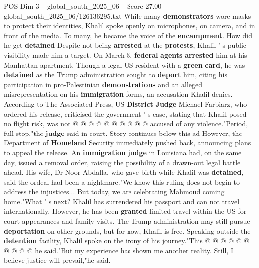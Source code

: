 \begin{textsample}{POS Dim 3 – global\_south\_2025\_06 – Score 27.00 – global\_south\_2025\_06/126136295.txt}
While many \textbf{demonstrators} wore masks to protect their identities, Khalil spoke openly on microphones, on camera, and in front of the media.
To many, he became the voice of the \textbf{encampment}.
How did he get \textbf{detained} Despite not being \textbf{arrested} at the \textbf{protests}, Khalil ' s public visibility made him a target.
On March 8, \textbf{federal} \textbf{agents} \textbf{arrested} him at his Manhattan apartment.
Though a legal US resident with a \textbf{green} \textbf{card}, he was \textbf{detained} as the Trump administration sought to \textbf{deport} him, citing his participation in pro-Palestinian \textbf{demonstrations} and an alleged misrepresentation on his \textbf{immigration} forms, an accusation Khalil denies.
According to The Associated Press, US \textbf{District} \textbf{Judge} Michael Farbiarz, who ordered his release, criticised the government ' s case, stating that Khalil posed no flight risk, was not @ @ @ @ @ @ @ @ @ @ accused of any violence."Period, full stop,"the \textbf{judge} said in court.
Story continues below this ad However, the Department of \textbf{Homeland} Security immediately pushed back, announcing plans to appeal the release.
An \textbf{immigration} \textbf{judge} in Louisiana had, on the same day, issued a removal order, raising the possibility of a drawn-out legal battle ahead.
His wife, Dr Noor Abdalla, who gave birth while Khalil was \textbf{detained}, said the ordeal had been a nightmare."We know this ruling does not begin to address the injustices...
But today, we are celebrating Mahmoud coming home."What ' s next?
Khalil has surrendered his passport and can not travel internationally.
However, he has been \textbf{granted} limited travel within the US for court appearances and family visits.
The Trump administration may still pursue \textbf{deportation} on other grounds, but for now, Khalil is free.
Speaking outside the \textbf{detention} facility, Khalil spoke on the irony of his journey."This @ @ @ @ @ @ @ @ @ @ he said."But my experience has shown me another reality.
Still, I believe justice will prevail,"he said.

\end{textsample}
